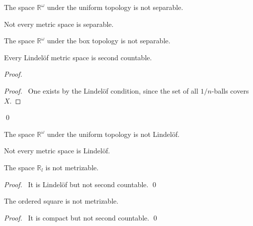 \begin{cor}
  The space $\mathbb{R}^\omega$ under the uniform topology is not separable.
\end{cor}

\begin{cor}
  Not every metric space is separable.
\end{cor}

\begin{cor}
  The space $\mathbb{R}^\omega$ under the box topology is not separable.
\end{cor}
\begin{prop}[CC]
  \label{prop:topology:metric:Lindelof_second_countable}
  Every Lindel\"{o}f metric space is second countable.
\end{prop}

\begin{proof}
  \pf
  \begin{proof}
    \pf\ One exists by the Lindel\"{o}f condition, since the set of all
    $1/n$-balls covers $X$.
  \end{proof}
  \qed
\end{proof}

\begin{cor}
  The space $\mathbb{R}^\omega$ under the uniform topology is not
  Lindel\"{o}f.
\end{cor}

\begin{cor}
  Not every metric space is Lindel\"{o}f.
\end{cor}

\begin{prop}
  The space $\mathbb{R}_l$ is not metrizable.
\end{prop}

\begin{proof}
  \pf\ It is Lindel\"{o}f but not second countable. \qed
\end{proof}

\begin{prop}
  The ordered square is not metrizable.
\end{prop}

\begin{proof}
  \pf\ It is compact but not second countable. \qed
\end{proof}

